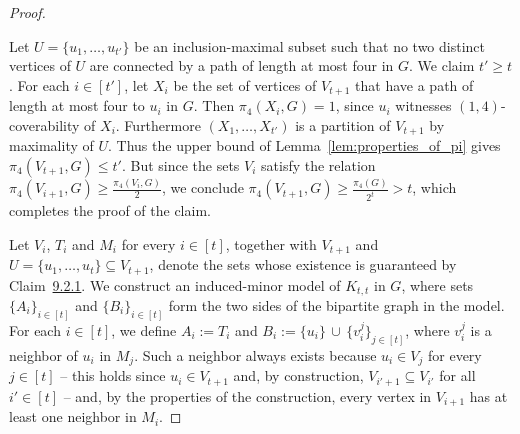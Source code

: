 \begin{proof}
\begin{claimproof}
        Let $U = \{u_1,\dots,u_{t'}\}$ be an inclusion-maximal subset such that no two distinct vertices of $U$ are connected by a path of length at most four in $G$. We claim $t' \geq t$. For each $i \in [t']$, let $X_i$ be the set of vertices of $V_{t+1}$ that have a path of length at most four to $u_i$ in $G$. Then $\pi_4(X_i,G) = 1$, since $u_i$ witnesses $(1,4)$-coverability of $X_i$. Furthermore $(X_1,\dots,X_{t'})$ is a partition of $V_{t+1}$ by maximality of $U$. Thus the upper bound of Lemma~\ref{lem:properties_of_pi} gives $\pi_4(V_{t+1},G) \leq t'$. But since the sets $V_i$ satisfy the relation $\pi_4(V_{i+1}, G) \geq \frac{\pi_4(V_i, G)}{2}$, we conclude $\pi_4(V_{t+1}, G) \geq \frac{\pi_4(G)}{2^t} > t$, which completes the proof of the claim. 
    \end{claimproof}
    
    Let $V_i$, $T_i$ and $M_i$ for every $i \in [t]$, together with $V_{t+1}$ and $U = \{u_1,\dots, u_t\} \subseteq V_{t+1}$, denote the sets whose existence is guaranteed by Claim~\hyperref[claim:recursive_layering]{9.2.1}. We construct an induced-minor model of $K_{t,t}$ in $G$, where sets $\{A_i\}_{i \in [t]}$ and $\{B_i\}_{i \in [t]}$ form the two sides of the bipartite graph in the model. For each $i \in [t]$, we define $A_i := T_i$ and $B_i := \{u_i\}\, \cup\, \{v_i^j\}_{j \in [t]}$, where $v_i^j$ is a neighbor of $u_i$ in $M_j$. Such a neighbor always exists because $u_i \in V_j$ for every $j \in [t]$ -- this holds since $u_i \in V_{t+1}$ and, by construction, $V_{i'+1} \subseteq V_{i'}$ for all $i' \in [t]$ -- and, by the properties of the construction, every vertex in $V_{i+1}$ has at least one neighbor in $M_i$.


\end{proof}
